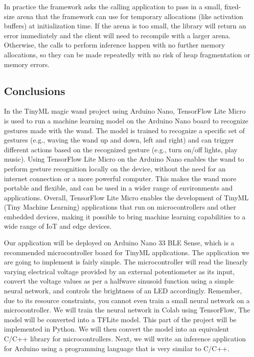 \begin{enumerate}
	In practice the framework asks the calling application to pass in a small, fixed-size arena that the framework can use for temporary allocations (like activation buffers) at initialization time. If the arena is too small, the library will return an error immediately and the client will need to recompile with a larger arena. Otherwise, the calls to perform inference happen with no further memory allocations, so they can be made repeatedly with no risk of heap fragmentation or memory errors.\cite{War:2020}
	
\end{enumerate}

\subsection{Conclusions}
In the TinyML magic wand project using Arduino Nano, TensorFlow Lite Micro is used to run a machine learning model on the Arduino Nano board to recognize gestures made with the wand. The model is trained to recognize a specific set of gestures (e.g., waving the wand up and down,
left and right) and can trigger different actions based on the recognized
gesture (e.g., turn on/off lights, play music).
Using TensorFlow Lite Micro on the Arduino Nano enables the wand
to perform gesture recognition locally on the device, without the need
for an internet connection or a more powerful computer. This makes the
wand more portable and flexible, and can be used in a wider range of
environments and applications.
Overall, TensorFlow Lite Micro enables the development of TinyML
(Tiny Machine Learning) applications that run on microcontrollers and other embedded devices, making it possible to bring machine learning
capabilities to a wide range of IoT and edge devices.\cite{Gomez:2012}

Our application will be deployed on Arduino Nano 33 BLE Sense, which is a recommended microcontroller board for TinyML applications. The application we are going to implement is fairly simple. The microcontroller will read the linearly varying electrical voltage provided by an external potentiometer as its input, convert the voltage values as per a halfwave sinusoid function using a simple neural network, and controls the brightness of an LED accordingly. Remember, due to its resource constraints, you cannot even train a small neural network on a microcontroller. We will train the neural network in Colab using TensorFlow, The model will be converted into a TFLite model. This part of the project will be implemented in Python. We will then convert the model into an equivalent C/C++ library for microcontrollers. Next, we will write an inference application for Arduino using a programming language that is very similar to C/C++. 

